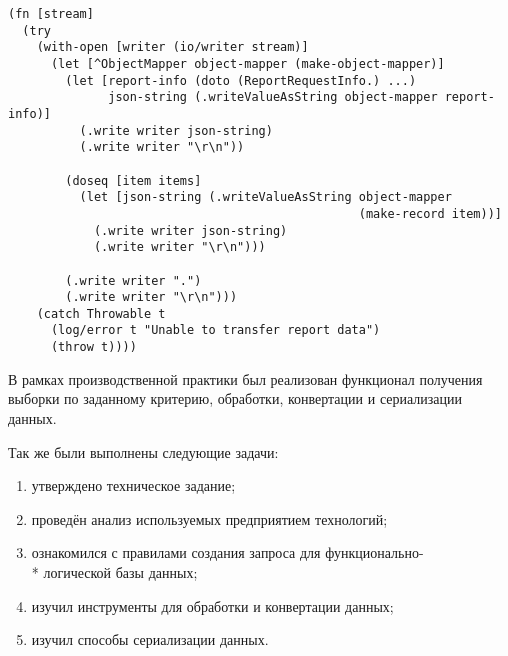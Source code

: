 \begin{lstlisting}[label=code:serialize, caption={Сериализация объектов}]
(fn [stream]
  (try
    (with-open [writer (io/writer stream)]
      (let [^ObjectMapper object-mapper (make-object-mapper)]
        (let [report-info (doto (ReportRequestInfo.) ...)
              json-string (.writeValueAsString object-mapper report-info)]
          (.write writer json-string)
          (.write writer "\r\n"))

        (doseq [item items]
          (let [json-string (.writeValueAsString object-mapper
                                                 (make-record item))]
            (.write writer json-string)
            (.write writer "\r\n")))

        (.write writer ".")
        (.write writer "\r\n")))
    (catch Throwable t
      (log/error t "Unable to transfer report data")
      (throw t))))
\end{lstlisting}

\clearpage



В рамках производственной практики был реализован функционал получения выборки по заданному критерию, обработки, конвертации и сериализации данных.

Так же были выполнены следующие задачи:
\begin{enumerate}
	\item утверждено техническое задание;
	\item проведён анализ используемых предприятием технологий;
	\item ознакомился с правилами создания запроса для функционально-\\* логической базы данных;
	\item изучил инструменты для обработки и конвертации данных;
	\item изучил способы сериализации данных.
\end{enumerate}


\clearpage


\begingroup
\renewcommand{\section}[2]{}

   
\endgroup


